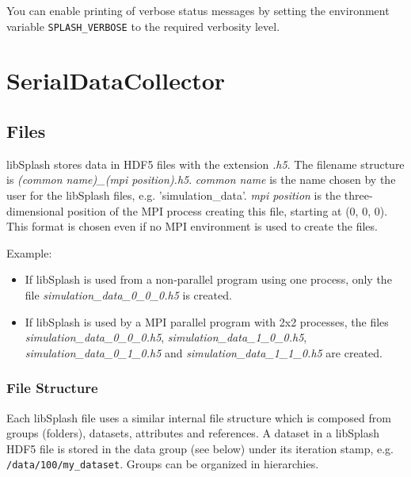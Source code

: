 \documentclass[a4paper,10pt,BCOR12mm]{report}
\newcommand{\command}[1]{\small \texttt{#1}}
\newcommand{\code}[1]{\small \texttt{#1}}
\begin{document}
You can enable printing of verbose status messages by setting the environment variable
\command{SPLASH\_VERBOSE} to the required verbosity level.


\chapter{SerialDataCollector}

\section{Files}

libSplash stores data in HDF5 files with the extension \emph{.h5}.
The filename structure is \emph{(common name)\_(mpi position).h5}.
\emph{common name} is the name chosen by the user for the libSplash files, e.g.
'simulation\_data'.
\emph{mpi position} is the three-dimensional position of the MPI process creating this
file, starting at (0, 0, 0).
This format is chosen even if no MPI environment is used to create the files.

Example:
\begin{itemize}
	\item If libSplash is used from a non-parallel program using one process,
	  only the file \emph{simulation\_data\_0\_0\_0.h5} is created.

	\item If libSplash is used by a MPI parallel program with 2x2 processes, the files
	\emph{simulation\_data\_0\_0\_0.h5}, \emph{simulation\_data\_1\_0\_0.h5},
	\emph{simulation\_data\_0\_1\_0.h5} and \emph{simulation\_data\_1\_1\_0.h5} are created.
\end{itemize}


\subsection{File Structure}

Each libSplash file uses a similar internal file structure which is composed from groups (folders),
datasets, attributes and references. A dataset in a libSplash HDF5 file is stored in the data group
(see below) under its iteration stamp, e.g. \code{/data/100/my\_dataset}.
Groups can be organized in hierarchies.
\end{document}

